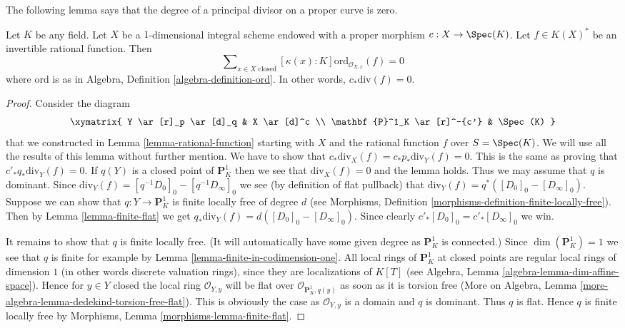 \noindent
The following lemma says that the degree of a principal divisor on
a proper curve is zero.

\begin{lemma}
\label{lemma-curve-principal-divisor}
Let $K$ be any field. Let $X$ be a $1$-dimensional integral scheme
endowed with a proper morphism $c : X \to \Spec(K)$.
Let $f \in K(X)^*$ be an invertible rational function.
Then
$$
\sum\nolimits_{x \in X \text{ closed}}
[\kappa(x) : K] \text{ord}_{\mathcal{O}_{X, x}}(f)
=
0
$$
where $\text{ord}$ is as in
Algebra, Definition \ref{algebra-definition-ord}.
In other words, $c_*\text{div}(f) = 0$.
\end{lemma}

\begin{proof}
Consider the diagram
$$
\xymatrix{
Y \ar[r]_p \ar[d]_q & X \ar[d]^c \\
\mathbf{P}^1_K \ar[r]^-{c'} & \Spec(K)
}
$$
that we constructed in Lemma \ref{lemma-rational-function}
starting with $X$ and the rational function $f$ over $S = \Spec(K)$.
We will use all the results of this lemma without further mention.
We have to show that $c_*\text{div}_X(f) = c_*p_*\text{div}_Y(f) = 0$.
This is the same as proving that $c'_*q_*\text{div}_Y(f) = 0$.
If $q(Y)$ is a closed point of $\mathbf{P}^1_K$ then we
see that $\text{div}_X(f) = 0$ and the lemma holds.
Thus we may assume that $q$ is dominant.
Since $\text{div}_Y(f) = [q^{-1}D_0]_0 - [q^{-1}D_\infty]_0$
we see (by definition of flat pullback) that
$\text{div}_Y(f) = q^*([D_0]_0 - [D_\infty]_0)$.
Suppose we can show that $q : Y \to \mathbf{P}^1_K$ is finite
locally free of degree $d$ (see
Morphisms, Definition \ref{morphisms-definition-finite-locally-free}).
Then by Lemma \ref{lemma-finite-flat} we get
$q_*\text{div}_Y(f) = d([D_0]_0 - [D_\infty]_0)$.
Since clearly $c'_*[D_0]_0 = c'_*[D_\infty]_0$ we win.

\medskip\noindent
It remains to show that $q$ is finite locally free.
(It will automatically have some given degree as $\mathbf{P}^1_K$
is connected.)
Since $\dim(\mathbf{P}^1_K) = 1$ we see that $q$ is finite for example
by Lemma \ref{lemma-finite-in-codimension-one}.
All local rings of $\mathbf{P}^1_K$ at
closed points are regular local rings of dimension $1$
(in other words discrete valuation rings), since they are
localizations of $K[T]$ (see
Algebra, Lemma \ref{algebra-lemma-dim-affine-space}).
Hence for $y\in Y$ closed the local ring $\mathcal{O}_{Y, y}$
will be flat over $\mathcal{O}_{\mathbf{P}^1_K, q(y)}$ as soon as
it is torsion free (More on Algebra, Lemma
\ref{more-algebra-lemma-dedekind-torsion-free-flat}).
This is obviously the case as
$\mathcal{O}_{Y, y}$ is a domain and $q$ is dominant.
Thus $q$ is flat. Hence $q$ is finite locally free by
Morphisms, Lemma \ref{morphisms-lemma-finite-flat}.
\end{proof}






